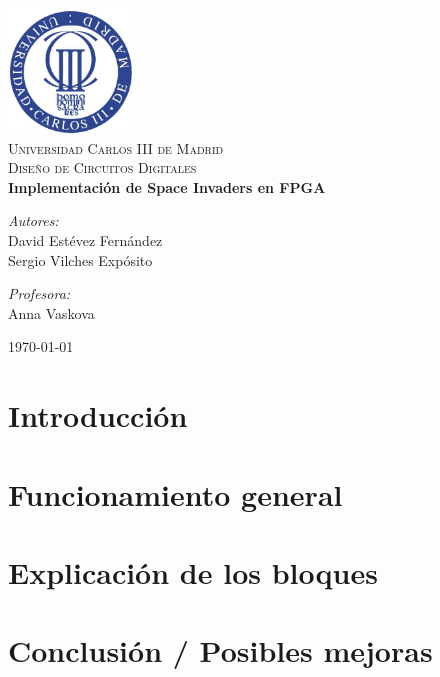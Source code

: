 \documentclass{article}
\begin{document}
\begin{center}
\includegraphics[width=0.25\textwidth]{./uc3m.jpg}\\[2cm]
\textsc{\LARGE Universidad Carlos III de Madrid}\\[0.5cm]
\textsc{\Large Diseño de Circuitos Digitales}\\[4cm]


{\huge \bfseries{Implementación de Space Invaders en FPGA}\\[8cm]}


\begin{minipage}{0.55\textwidth}
\begin{flushleft} \large
\emph{Autores:}\\
David Estévez Fernández\\
Sergio Vilches Expósito\\
\end{flushleft}
\end{minipage}
\begin{minipage}{0.4\textwidth}
\begin{flushright} \large
\emph{Profesora:}\\
Anna Vaskova
\end{flushright}\end{minipage}\vfill

{\large \today}

\end{center}
%
\newpage
%
\tableofcontents
\newpage


\section{Introducción}

\section{Funcionamiento general}

\section{Explicación de los bloques}
\label{blocksexplanation}
%






\newpage
\section{Conclusión / Posibles mejoras}
%
\end{document}
